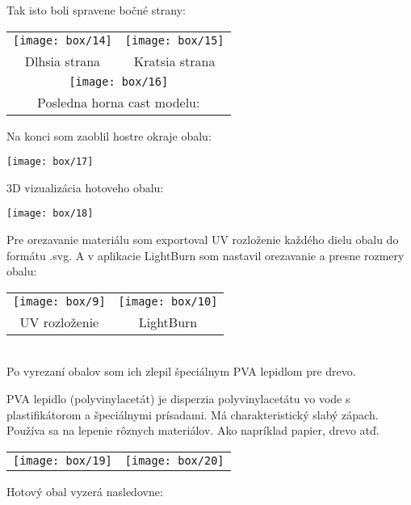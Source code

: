        Tak isto boli spravene bočné strany: \\

        \begin{tabular}{c c}
          \texttt{[image: box/14]} & \texttt{[image: box/15]} \\
          Dlhsia strana & Kratsia strana \\ \multicolumn{2}{c}{\texttt{[image: box/16]}} \\
          \multicolumn{2}{c}{Posledna horna cast modelu:}
        \end{tabular}

        Na konci som zaoblil hostre okraje obalu:

        \begin{center}
          \texttt{[image: box/17]}
        \end{center}

        3D vizualizácia hotoveho obalu: \\

        \begin{center}
          \texttt{[image: box/18]}
        \end{center}

        Pre orezavanie materiálu som exportoval UV rozloženie každého dielu obalu do formátu .svg. A v aplikacie LightBurn som nastavil orezavanie a presne rozmery obalu:

        \begin{tabular}{c c}
          \texttt{[image: box/9]} & \texttt{[image: box/10]} \\
          UV rozloženie & LightBurn \\
        \end{tabular} \\

        Po vyrezaní obalov som ich zlepil špeciálnym PVA lepidlom pre drevo.

        PVA lepidlo (polyvinylacetát) je disperzia polyvinylacetátu vo vode s plastifikátorom a špeciálnymi prísadami. Má charakteristický slabý zápach. Používa sa na lepenie rôznych materiálov. Ako napríklad papier, drevo atď. \\

        \begin{tabular}{c c}
          \texttt{[image: box/19]} & \texttt{[image: box/20]} \\
        \end{tabular}
        Hotový obal vyzerá nasledovne:

